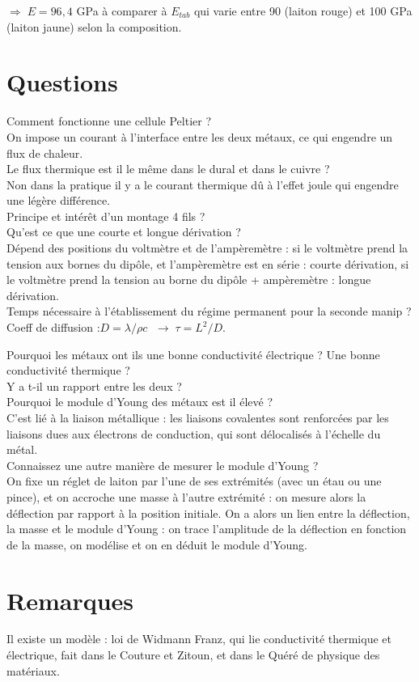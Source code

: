 \documentclass[12pt,prb,aps,epsf]{article}
\begin{document}
$\Rightarrow \; E = 96,4$ GPa  à comparer à $E_{tab}$ qui varie entre 90 (laiton rouge) et 100 GPa (laiton jaune) selon la composition.

\section*{Questions}
Comment fonctionne une cellule Peltier ?\\
On impose un courant à l'interface entre les deux métaux, ce qui engendre un flux de chaleur.\\

Le flux thermique est il le même dans le dural et dans le cuivre ?\\
Non dans la pratique il y a le courant thermique dû à l'effet joule qui engendre une légère différence.\\

Principe et intérêt d'un montage 4 fils ?\\

Qu'est ce que une courte et longue dérivation ?\\
Dépend des positions du voltmètre et de l'ampèremètre : si le voltmètre prend la tension aux bornes du dipôle, et l'ampèremètre est en série : courte dérivation, si le voltmètre prend la tension au borne du dipôle + ampèremètre : longue dérivation.\\

Temps nécessaire à l'établissement du régime permanent pour la seconde manip ?\\
Coeff de diffusion :$D = \lambda/\rho c$ $\;\longrightarrow\; \tau = L^2/D$.

Pourquoi les métaux ont ils une bonne conductivité électrique ? Une bonne conductivité thermique ?\\

Y a t-il un rapport entre les deux ?\\

Pourquoi le module d'Young des métaux est il élevé ?\\
C'est lié à la liaison métallique : les liaisons covalentes sont renforcées par les liaisons dues aux électrons de conduction, qui sont délocalisés à l'échelle du métal.\\

Connaissez une autre manière de mesurer le module d'Young ?\\
On fixe un réglet de laiton par l'une de ses extrémités (avec un étau ou une pince), et on accroche une masse à l'autre extrémité : on mesure alors la déflection par rapport à la position initiale. On a alors un lien entre la déflection, la masse et le module d'Young : on trace l'amplitude de la déflection en fonction de la masse, on modélise et on en déduit le module d'Young.


\section{Remarques}
Il existe un modèle : loi de Widmann Franz, qui lie conductivité thermique et électrique, fait dans le Couture et Zitoun, et dans le Quéré de physique des matériaux.
\end{document}
